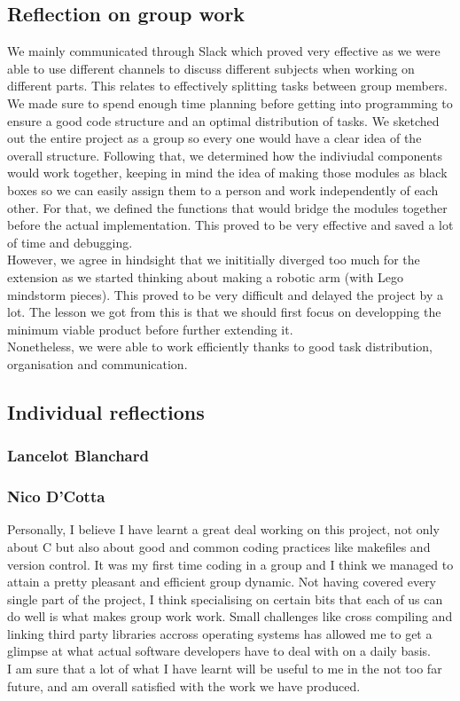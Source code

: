 \documentclass[11pt]{article}
\begin{document}
\subsection{Reflection on group work}
We mainly communicated through Slack which proved very effective as we were able
to use different channels to discuss different subjects when working on
different parts. This relates to effectively splitting tasks between group
members. We made sure to spend enough time planning before getting into
programming to ensure a good code structure and an optimal distribution of
tasks. We sketched out the entire project as a group so every one would have a
clear idea of the overall structure. Following that, we determined how the
indiviudal components would work together, keeping in mind the idea of making
those modules as black boxes so we can easily assign them to a person and work
independently of each other. For that, we defined the functions that would
bridge the modules together before the actual implementation. This proved to be
very effective and saved a lot of time and debugging.\\
However, we agree in hindsight that we inititially diverged too much for the
extension as we started thinking about making a robotic arm (with Lego mindstorm
pieces). This proved to be very difficult and delayed the project by a lot. The
lesson we got from this is that we should first focus on developping the minimum
viable product before further extending it.\\
Nonetheless, we were able to work efficiently thanks to good task distribution,
organisation and communication.

\subsection{Individual reflections}
\subsubsection{Lancelot Blanchard}
\subsubsection{Nico D'Cotta}
Personally, I believe I have learnt a great deal working on this project, not
only about C but also about good and common coding practices like makefiles and
version control.
It was my first time coding in a group and I think we managed to attain a pretty
pleasant and efficient group dynamic. Not having covered every single part of
the project, I think specialising on certain bits that each of us can do well is
what makes group work work. Small challenges like cross compiling and linking
third party libraries accross operating systems has allowed me to get a glimpse
at what actual software developers have to deal with on a daily basis. \\
I am sure that a lot of what I have learnt will be useful to me in the not too
far future, and am overall satisfied with the work we have produced.
\end{document}
